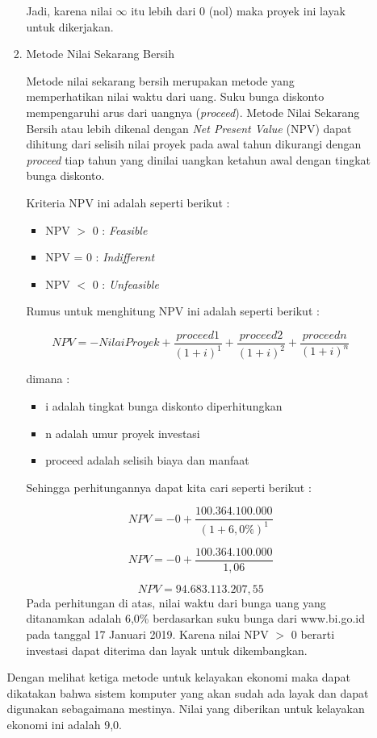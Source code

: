 \documentclass[pdftex,12pt, oneside]{article}
\begin{document}
\begin{enumerate}
\begin{enumerate}
\begin{enumerate}
Jadi, karena nilai $ \infty $ itu lebih dari 0 (nol) maka proyek ini layak untuk dikerjakan.

	\item Metode Nilai Sekarang Bersih
	
Metode nilai sekarang bersih merupakan metode yang memperhatikan nilai waktu dari uang. Suku bunga diskonto mempengaruhi arus dari uangnya (\textit{proceed}). Metode Nilai Sekarang Bersih atau lebih dikenal dengan \textit{Net Present Value} (NPV) dapat dihitung dari selisih nilai proyek pada awal tahun dikurangi dengan \textit{proceed} tiap tahun yang dinilai uangkan ketahun awal dengan tingkat bunga diskonto.

Kriteria NPV ini adalah seperti berikut :

\begin{itemize}
	\item NPV $>$ 0 : \textit{Feasible}
	\item NPV = 0 : \textit{Indifferent}
	\item NPV $<$ 0 : \textit{Unfeasible}
\end{itemize}

Rumus untuk menghitung NPV ini adalah seperti berikut :

\[ NPV = - NilaiProyek + \frac{proceed1}{(1 + i)^1} + \frac{proceed2}{(1 + i)^2} + \frac{proceedn}{(1 + i)^n} \]

dimana :

\begin{itemize}
	\item i adalah tingkat bunga diskonto diperhitungkan
	\item n adalah umur proyek investasi
	\item proceed adalah selisih biaya dan manfaat
\end{itemize}

Sehingga perhitungannya dapat kita cari seperti berikut :

\[ NPV = - 0 + \frac{100.364.100.000}{(1 + 6,0\%)^1} \]

\[ NPV = - 0 + \frac{100.364.100.000}{1,06} \]

\[ NPV =  94.683.113.207,55 \]
Pada perhitungan di atas, nilai waktu dari bunga uang yang ditanamkan adalah 6,0\% berdasarkan suku bunga dari www.bi.go.id pada tanggal 17 Januari 2019. Karena nilai NPV $>$ 0 berarti investasi dapat diterima dan layak untuk dikembangkan.
	
\end{enumerate}

Dengan melihat ketiga metode untuk kelayakan ekonomi maka dapat dikatakan bahwa sistem komputer yang akan sudah ada layak dan dapat digunakan sebagaimana mestinya. Nilai yang diberikan untuk kelayakan ekonomi ini adalah 9,0.
	

\end{enumerate}
\end{enumerate}
\end{document}
